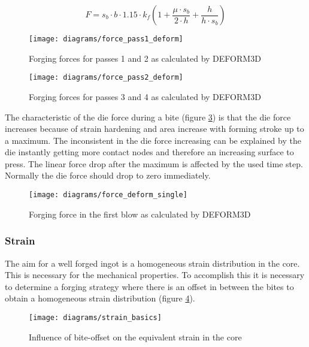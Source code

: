 \begin{equation}
F = s_b \cdot b \cdot 1.15 \cdot k_f \left(1+\frac{\mu\cdot s_b}{2\cdot h} + \frac{h}{h\cdot s_b}\right)
\end{equation}

\begin{figure}[htbp]
  \centering
  \texttt{[image: diagrams/force\_pass1\_deform]}
  \caption{Forging forces for passes 1 and 2 as calculated by DEFORM3D}
  \label{img:forgforce_deform_p1}
\end{figure}

\begin{figure}[htbp]
  \centering
  \texttt{[image: diagrams/force\_pass2\_deform]}
  \caption{Forging forces for passes 3 and 4 as calculated by DEFORM3D}
  \label{img:forgforce_deform_p2}
\end{figure}

The characteristic of the die force during a bite (figure \ref{img:forgeforce_deform_single}) is that the die force increases because of strain hardening and area increase with forming stroke up to a maximum. The inconsistent in the die force increasing can be explained by the die instantly getting more contact nodes and therefore an increasing surface to press. The linear force drop after the maximum is affected by the used time step. Normally the die force should drop to zero immediately.

\begin{figure}[tb]
  \centering
  \texttt{[image: diagrams/force\_deform\_single]}
  \caption{Forging force in the first blow as calculated by DEFORM3D}
  \label{img:forgeforce_deform_single}
\end{figure}

\subsubsection{Strain}

The aim for a well forged ingot is a homogeneous strain distribution in the core. This is necessary for the mechanical properties. To accomplish this it is necessary to determine a forging strategy where there is an offset in between the bites to obtain a homogeneous strain distribution (figure \ref{img:strain_basics}).

\begin{figure}[tb]
  \centering
  \texttt{[image: diagrams/strain\_basics]}
  \caption{Influence of bite-offset on the equivalent strain in the core \cite{skript}}
  \label{img:strain_basics}
\end{figure}

